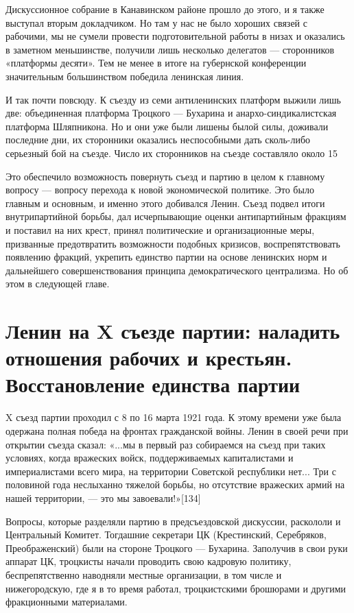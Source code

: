 \documentclass[12pt, a4paper, openany]{book}
\begin{document}
Дискуссионное собрание в Канавинском районе прошло до этого, и я также выступал вторым докладчиком. Но там у нас не было хороших связей с рабочими, мы не сумели провести подготовительной работы в низах и оказались в заметном меньшинстве, получили лишь несколько делегатов — сторонников «платформы десяти». Тем не менее в итоге на губернской конференции значительным большинством победила ленинская линия.

И так почти повсюду. К съезду из семи антиленинских платформ выжили лишь две: объединенная платформа Троцкого — Бухарина и анархо-синдикалистская платформа Шляпникона. Но и они уже были лишены былой силы, доживали последние дни, их сторонники оказались неспособными дать сколь-либо серьезный бой на съезде. Число их сторонников на съезде составляло около 15 %

Это обеспечило возможность повернуть съезд и партию в целом к главному вопросу — вопросу перехода к новой экономической политике. Это было главным и основным, и именно этого добивался Ленин. Съезд подвел итоги внутрипартийной борьбы, дал исчерпывающие оценки антипартийным фракциям и поставил на них крест, принял политические и организационные меры, призванные предотвратить возможности подобных кризисов, воспрепятствовать появлению фракций, укрепить единство партии на основе ленинских норм и дальнейшего совершенствования принципа демократического централизма. Но об этом в следующей главе.

\newpage
\section[Ленин на X съезде партии: наладить отношения рабочих и крестьян. Восстановление единства партии]{\center \textbf{Ленин на X съезде партии: наладить отношения рабочих и крестьян. Восстановление единства партии}}


X съезд партии проходил с 8 по 16 марта 1921 года. К этому времени уже была одержана полная победа на фронтах гражданской войны. Ленин в своей речи при открытии съезда сказал: «...мы в первый раз собираемся на съезд при таких условиях, когда вражеских войск, поддерживаемых капиталистами и империалистами всего мира, на территории Советской республики нет... Три с половиной года неслыханно тяжелой борьбы, но отсутствие вражеских армий на нашей территории, — это мы завоевали!»[134]

Вопросы, которые разделяли партию в предсъездовской дискуссии, раскололи и Центральный Комитет. Тогдашние секретари ЦК (Крестинский, Серебряков, Преображенский) были на стороне Троцкого — Бухарина. Заполучив в свои руки аппарат ЦК, троцкисты начали проводить свою кадровую политику, беспрепятственно наводняли местные организации, в том числе и нижегородскую, где я в то время работал, троцкистскими брошюрами и другими фракционными материалами.
\end{document}
